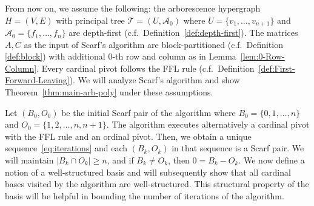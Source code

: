 \documentclass[11pt]{article}
\begin{document}
From now on, we assume the following: the arborescence hypergraph $H=(V,E)$ with principal tree $\mathcal{T}=(U,\mathcal{A}_0)$ where $U=\{v_1,\dots,v_{n+1}\}$ and $\mathcal{A}_0=\{f_1,\dots,f_n\}$ are depth-first (c.f.~Definition~\ref{def:depth-first}). The matrices $A,C$ as the input of Scarf's algorithm are block-partitioned (c.f.~Definition \ref{def:block}) with additional $0$-th row and column as in Lemma~\ref{lem:0-Row-Column}. Every cardinal pivot follows the FFL rule (c.f.~Definition~\ref{def:First-Forward-Leaving}). We will analyze Scarf's algorithm and show Theorem~\ref{thm:main-arb-poly} under these assumptions.

Let $(B_0,O_0)$ be the initial Scarf pair of the algorithm where $B_0=\{0,1,\dots,n\}$ and $O_0=\{1,2,\dots,n,n+1\}$. The algorithm executes alternatively a cardinal pivot with the FFL rule and an ordinal pivot. Then, we obtain a unique sequence~\eqref{eq:iterations} and each $(B_k,O_k)$ in that sequence is a Scarf pair. We will maintain $|B_k\cap O_k|\ge n$, and if $B_k\neq O_k$, then $0=B_k-O_k$. We now define a notion of a well-structured basis and will subsequently show that all cardinal bases visited by the algorithm 
are well-structured. 
This structural property of the basis will be helpful in bounding the number of iterations of the algorithm. 
\end{document}
